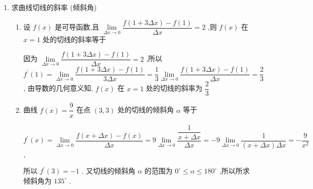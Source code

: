 \begin{enumerate}
\begin{enumerate}
\begin{jieda}
            可得 $\dfrac{1}{2}{f}^{\prime }\left( 1\right)  = \dfrac{1}{2}\left( {\dfrac{1}{1} + 3 \times  {1}^{2}}\right)  = 2$ ,即 $\mathop{\lim }\limits_{{{\Delta x} \rightarrow  0 }}\dfrac{f\left( {1 + {\Delta x}}\right)  - f\left( 1\right) }{2\Delta x} = 2$ .
        \end{jieda}

    \end{enumerate}

    \item 求曲线切线的斜率 (倾斜角)
    \begin{enumerate}
        \item 设 $f\left( x\right)$ 是可导函数,且 $\mathop{\lim }\limits_{{{\Delta x} \rightarrow  0 }}\dfrac{f\left( {1 + {3\Delta x}}\right)  - f\left( 1\right) }{\Delta x} = 2$ ,则 $f\left( x\right)$ 在 $x = 1$ 处的切线的斜率等于
        \begin{jieda}
            因为 $\mathop{\lim }\limits_{{{\Delta x} \rightarrow  0 }}\dfrac{f\left( {1 + {3\Delta x}}\right)  - f\left( 1\right) }{\Delta x} = 2$ ,所以 ${f}^{\prime }\left( 1\right)  = \mathop{\lim }\limits_{{{\Delta x} \rightarrow  0 }}\dfrac{f\left( {1 + {3\Delta x}}\right)  - f\left( 1\right) }{3\Delta x} = \dfrac{1}{3}\mathop{\lim }\limits_{{{\Delta x} \rightarrow  0 }}\dfrac{f\left( {1 + {3\Delta x}}\right)  - f\left( 1\right) }{\Delta x} = \dfrac{2}{3}$ , 由导数的几何意义知, $f\left( x\right)$ 在 $x = 1$ 处的切线的斜率为 $\dfrac{2}{3}$
        \end{jieda}
        
        \item 曲线 $f\left( x\right)  = \dfrac{9}{x}$ 在点 $\left( {3,3}\right)$ 处的切线的倾斜角 $\alpha$ 等于
        \begin{jieda}
            ${f}^{\prime }\left( x\right)  = \mathop{\lim }\limits_{{{\Delta x} \rightarrow  0 }}\dfrac{f\left( {x + {\Delta x}}\right)  - f\left( x\right) }{\Delta x} = 9\mathop{\lim }\limits_{{{\Delta x} \rightarrow  0 }}\dfrac{\dfrac{1}{x + {\Delta x}}}{\Delta x} =  - 9\mathop{\lim }\limits_{{{\Delta x} \rightarrow  0 }}\dfrac{1}{\left( {x + {\Delta x}}\right) {\Delta x}} =  - \dfrac{9}{{x}^{2}}$ ,
            
            所以 ${f}^{\prime }\left( 3\right)  =  - 1$ . 又切线的倾斜角 $\alpha$ 的范围为 ${0}^{ \circ  } \leq  \alpha  \leq  {180}^{ \circ  }$ ,所以所求倾斜角为 ${135}^{ \circ  }$ .
        \end{jieda}


\end{enumerate}
\end{enumerate}
